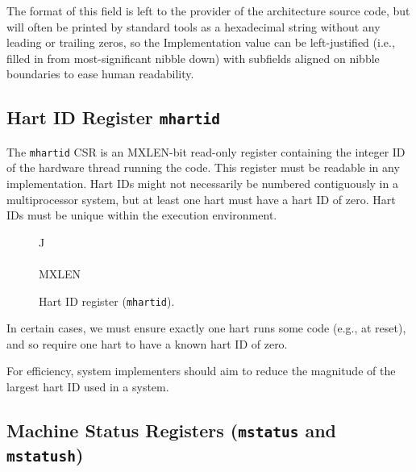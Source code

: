 \begin{commentary}
The format of this field is left to the provider of the architecture
source code, but will often be printed by standard tools as a
hexadecimal string without any leading or trailing zeros, so the
Implementation value can be left-justified (i.e., filled in from
most-significant nibble down) with subfields aligned on nibble
boundaries to ease human readability.
\end{commentary}

\subsection{Hart ID Register {\tt mhartid}}

The {\tt mhartid} CSR is an MXLEN-bit read-only register
containing the integer ID of the hardware thread running the code.
This register must be readable in any implementation.  Hart IDs might
not necessarily be numbered contiguously in a multiprocessor system,
but at least one hart must have a hart ID of zero.  Hart IDs must be
unique within the execution environment.

\begin{figure*}[h!]
{\footnotesize
\begin{center}
\begin{tabular}{J}
 \\
\hline
{}\\
\hline
MXLEN \\
\end{tabular}
\end{center}
}
\vspace{-0.1in}
\caption{Hart ID register ({\tt mhartid}).}
\label{mhartidreg}
\end{figure*}


\begin{commentary}
In certain cases, we must ensure exactly one hart runs some code
(e.g., at reset), and so require one hart to have a known hart ID of
zero.

For efficiency, system implementers should aim to reduce the magnitude
of the largest hart ID used in a system.
\end{commentary}

\subsection{Machine Status Registers ({\tt mstatus} and {\tt mstatush})}

